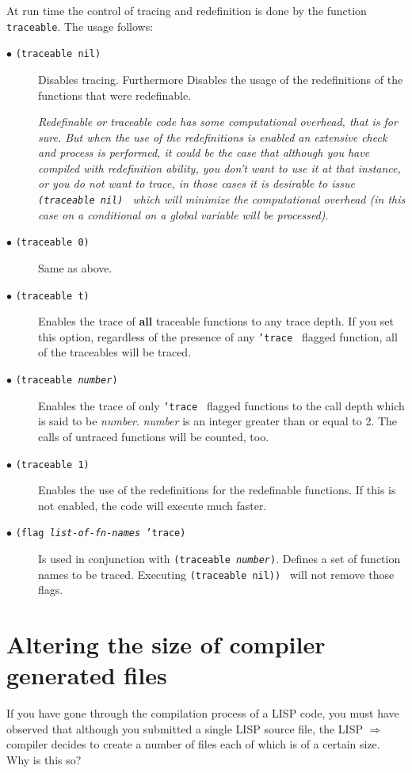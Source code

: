 At run time the control of tracing and redefinition is done by the function
{\tt traceable}. The usage follows:
\begin{description}

\item[$\bullet$ {\tt (traceable nil)}] Disables tracing. Furthermore
       Disables the usage of the redefinitions of the functions that were
       redefinable.

      {\em Redefinable or traceable code has some computational overhead,
           that is for sure. But when  the  use  of  the  redefinitions  is
           enabled an extensive check and process is performed, it could be
           the  case  that  although  you  have  compiled with redefinition
           ability, you don't want to use it at that instance,  or  you  do
           not want to trace, in those cases it is desirable to  issue
            {\tt (traceable nil) } which will minimize the computational
          overhead (in this case on a conditional on a global variable
          will be processed)}.
\item[$\bullet$ {\tt (traceable 0)}] Same as above.
\item[$\bullet$ {\tt (traceable t)}]
      Enables the trace of {\bf all} traceable functions to any trace depth.
      If you set this option, regardless of the presence of any
      {\tt 'trace } flagged function, all of the traceables will be traced.
\item[$\bullet$ {\tt (traceable {\em number})}]
     Enables the trace of only {\tt 'trace } flagged
      functions to the call depth
     which is said to be {\em number}. {\em number} is an integer greater
     than or equal to 2. The calls of untraced functions will be counted,
     too.
\item[$\bullet$ {\tt (traceable 1)}]
     Enables the use of the redefinitions for the redefinable functions.
     If this is not enabled, the code will execute much faster.
\item[$\bullet$ {\tt (flag {\em list-of-fn-names} 'trace)}]
     Is used in conjunction with {\tt (traceable {\em number})}.
     Defines a set of function names to be traced. Executing
     {\tt (traceable nil)) } will not remove those flags.
\end{description}

\section{Altering the size of compiler generated \C files}
If you have gone through the compilation process of a LISP code,
you must have observed that although you submitted a single
LISP source file, the LISP $\Rightarrow$ \C compiler decides
to create a number of files each of which is  of a certain size.
Why is this so?

